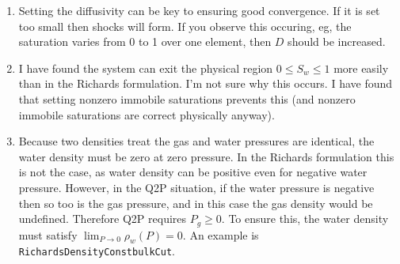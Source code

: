 \documentclass[]{scrreprt}
\begin{document}
\begin{enumerate}
\item Setting the diffusivity can be key to ensuring good convergence.
  If it is set too small then shocks will form.  If you observe this
  occuring, eg, the saturation   varies from 0 to 1 over one element,
  then $D$ should be increased. 

\item I have found the system can exit the physical region $0\leq
  S_{w} \leq 1$ more easily than in the Richards formulation.  I'm not
  sure why this occurs.  I have found that setting nonzero immobile
  saturations prevents this (and nonzero immobile saturations are
  correct physically anyway).

\item Because two densities treat the gas and water pressures are
  identical, the water density must be zero at zero pressure.  In the
  Richards formulation this is not the case, as water density can be
  positive even for negative water pressure.  However, in the Q2P
  situation, if the water pressure is negative then so too is the gas
  pressure, and in this case the gas density would be undefined.
  Therefore Q2P requires $P_{g}\geq 0$.  To ensure this, the water
  density must satisfy $\lim_{P\rightarrow 0}\rho_{w}(P) = 0$.  An
  example is {\tt RichardsDensityConstbulkCut}.

\end{enumerate}
\end{document}
